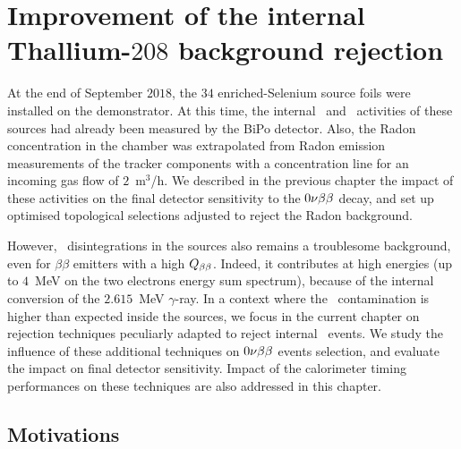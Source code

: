 \chapter{Improvement of the internal Thallium-$208$ background rejection}
\label{ch:timediff}

At the end of September $2018$, the $34$ enriched-Selenium source foils were installed on the demonstrator.
At this time, the internal \Tl\ and \Bi\ activities of these sources had already been measured by the BiPo detector.
Also, the Radon concentration in the chamber was extrapolated from Radon emission measurements of the tracker components with a concentration line for an incoming gas flow of $2$~m$^{3}$/h.
We described in the previous chapter the impact of these activities on the final detector sensitivity to the $0\nu\beta\beta$ decay, and set up optimised topological selections adjusted to reject the Radon background.

However, \Tl\ disintegrations in the sources also remains a troublesome background, even for $\beta\beta$ emitters with a high $Q_{\beta\beta}$.
Indeed, it contributes at high energies (up to $4$~MeV on the two electrons energy sum spectrum), because of the internal conversion of the $2.615$~MeV $\gamma$-ray.
In a context where the \Tl\ contamination is higher than expected inside the sources, we focus in the current chapter on rejection techniques peculiarly adapted to reject internal \Tl\ events.
We study the influence of these additional techniques on $0\nu\beta\beta$ events selection, and evaluate the impact on final detector sensitivity.
Impact of the calorimeter timing performances on these techniques are also addressed in this chapter.

\section{Motivations}

